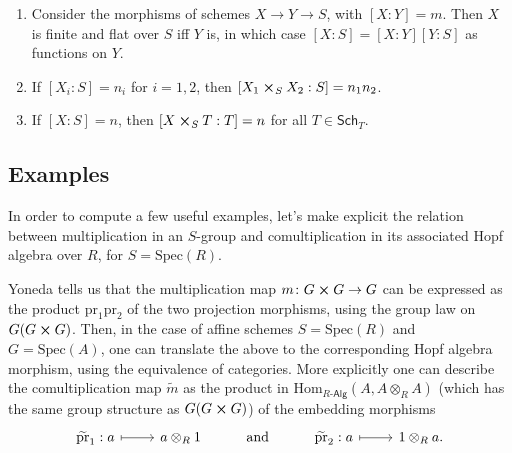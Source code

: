 \documentclass[../Main]{subfiles}
\begin{document}
\begin{prop}\leavevmode\vspace{-.2\baselineskip}
\begin{enumerate}
	\item Consider the morphisms of schemes $X \to Y \to S$, with $[X:Y] = m$.
		Then $X$ is finite and flat over $S$ iff $Y$ is, in which case
		$[X:S] = [X:Y] [Y:S]$ as functions on $Y$.
		
	\item If $[X_i:S] = n_i$ for $i=1,2$, then
		$[X_1 \cross_{ S } X_2 : S] = n_1n_2$.

	\item If $[X:S] = n$, then $[X \cross_{ S } T : T] = n$
		for all $T \in \mathsf{Sch}_{ T }$.
\end{enumerate}
\end{prop}


\subsection{Examples}
In order to compute a few useful examples, let's make explicit the relation between
multiplication in an $S$-group and comultiplication in its associated Hopf algebra over
$R$, for $S = \mathrm{Spec}(R)$.
\begin{rem}\label{rem:ExplicitComult}
	Yoneda tells us that the multiplication map 
	$m\colon G \cross G \to G$ can be expressed
	as the product $\mathrm{pr}_1 \mathrm{pr}_2$
	of the two projection morphisms, using the group law
	on $G(G \cross G)$.
	Then, in the case of affine schemes $S = \mathrm{Spec}(R)$
	and $G = \mathrm{Spec}(A)$, one can translate the above to the corresponding
	Hopf algebra morphism, using the equivalence of categories.
	More explicitly one can describe the comultiplication map
	$\widetilde{m}$ as the product in 
	$\mathrm{Hom}_{R\text{-}\mathsf{Alg}} \left( A, A \otimes_R A \right)$ 
	(which has the same group structure as $G(G \cross G)$)
	of the embedding morphisms
	\begin{equation*}
	\begin{tikzcd}
		\widetilde{\mathrm{pr}}_1: a \arrow[r, "", mapsto] &
		a \otimes_R 1 &
		\text{and} &
		\widetilde{\mathrm{pr}}_2: a \arrow[r, "", mapsto] &
		1 \otimes_R a
	.\end{tikzcd}
	\end{equation*}
\end{rem}
\end{document}
